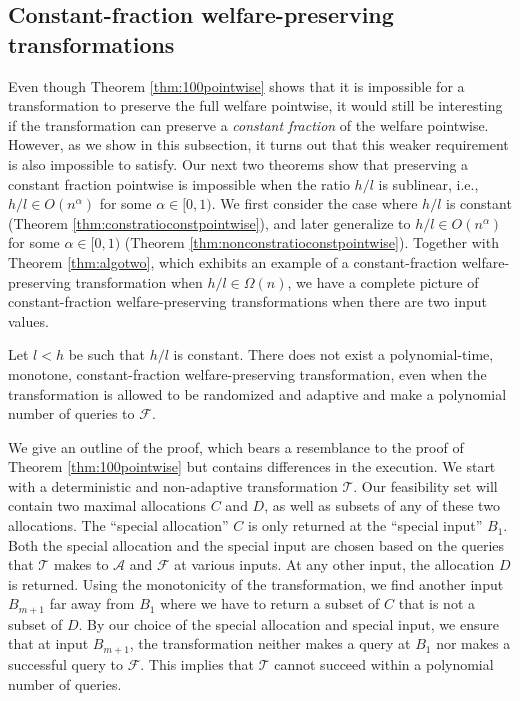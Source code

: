 \documentclass[runningheads,a4paper]{llncs}
\begin{document}
\subsection{Constant-fraction welfare-preserving transformations}

Even though Theorem \ref{thm:100pointwise} shows that it is impossible for a transformation to preserve the full welfare pointwise, it would still be interesting if the transformation can preserve a \emph{constant fraction} of the welfare pointwise. However, as we show in this subsection, it turns out that this weaker requirement is also impossible to satisfy. Our next two theorems show that preserving a constant fraction pointwise is impossible when the ratio $h/l$ is sublinear, i.e., $h/l\in O(n^\alpha)$ for some $\alpha\in[0,1)$. We first consider the case where $h/l$ is constant (Theorem \ref{thm:constratioconstpointwise}), and later generalize to $h/l\in O(n^\alpha)$ for some $\alpha\in[0,1)$ (Theorem \ref{thm:nonconstratioconstpointwise}). Together with Theorem \ref{thm:algotwo}, which exhibits an example of a constant-fraction welfare-preserving transformation when $h/l\in\Omega(n)$, we have a complete picture of constant-fraction welfare-preserving transformations when there are two input values.

\begin{theorem}
\label{thm:constratioconstpointwise}
Let $l<h$ be such that $h/l$ is constant. There does not exist a polynomial-time, monotone, constant-fraction welfare-preserving transformation, even when the transformation is allowed to be randomized and adaptive and make a polynomial number of queries to $\mathcal{F}$.
\end{theorem}

We give an outline of the proof, which bears a resemblance to the proof of Theorem \ref{thm:100pointwise} but contains differences in the execution. We start with a deterministic and non-adaptive transformation $\mathcal{T}$. Our feasibility set will contain two maximal allocations $C$ and $D$, as well as subsets of any of these two allocations. The ``special allocation'' $C$ is only returned at the ``special input'' $B_1$. Both the special allocation and the special input are chosen based on the queries that $\mathcal{T}$ makes to $\mathcal{A}$ and $\mathcal{F}$ at various inputs. At any other input, the allocation $D$ is returned. Using the monotonicity of the transformation, we find another input $B_{m+1}$ far away from $B_1$ where we have to return a subset of $C$ that is not a subset of $D$. By our choice of the special allocation and special input, we ensure that at input $B_{m+1}$, the transformation neither makes a query at $B_1$ nor makes a successful query to $\mathcal{F}$. This implies that $\mathcal{T}$ cannot succeed within a polynomial number of queries. 
\end{document}
